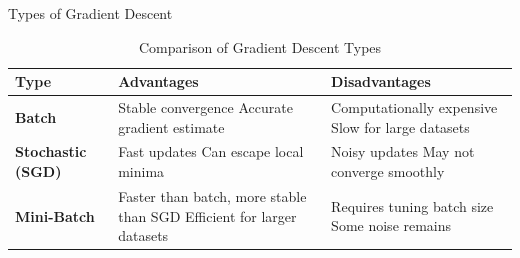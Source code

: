 \documentclass[serif, aspectratio=169]{beamer}
\begin{document}
\begin{frame}{Types of Gradient Descent}
\begin{table}[h!]
\centering
\begin{tabularx}{\textwidth}{@{} lX X @{}}
\toprule
\textbf{Type} & \textbf{Advantages} & \textbf{Disadvantages} \\ 
\midrule
\textbf{Batch}   & 
Stable convergence \newline 
Accurate gradient estimate  & 
Computationally expensive \newline 
Slow for large datasets \\ 
\midrule
\textbf{Stochastic (SGD)}   & 
Fast updates \newline 
Can escape local minima & 
Noisy updates \newline 
May not converge smoothly \\ 
\midrule
\textbf{Mini-Batch}   & 
Faster than batch, more stable than SGD \newline 
Efficient for larger datasets & 
Requires tuning batch size \newline 
Some noise remains \\ 
\bottomrule
\end{tabularx}
\caption{\footnotesize Comparison of Gradient Descent Types}
\end{table}
\end{frame}
\end{document}
